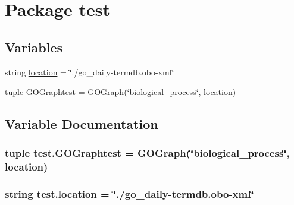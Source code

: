 \hypertarget{namespacetest}{
\section{Package test}
\label{namespacetest}
}
\subsection*{Variables}
\begin{DoxyCompactItemize}
\item 
string \hyperlink{namespacetest_a0bae5ddd9b608f2179d9b18864638081}{location} = \char`\"{}./go\_\-daily-\/termdb.obo-\/xml\char`\"{}
\item 
tuple \hyperlink{namespacetest_a49256f3800de70e9aabf11ea0c3bb8e1}{GOGraphtest} = \hyperlink{class_g_o_graph_1_1_g_o_graph}{GOGraph}(\char`\"{}biological\_\-process\char`\"{}, location)
\end{DoxyCompactItemize}


\subsection{Variable Documentation}
\hypertarget{namespacetest_a49256f3800de70e9aabf11ea0c3bb8e1}{
\subsubsection[{GOGraphtest}]{\setlength{\rightskip}{0pt plus 5cm}tuple {\bf test.GOGraphtest} = {\bf GOGraph}(\char`\"{}biological\_\-process\char`\"{}, location)}}
\label{namespacetest_a49256f3800de70e9aabf11ea0c3bb8e1}
\hypertarget{namespacetest_a0bae5ddd9b608f2179d9b18864638081}{
\subsubsection[{location}]{\setlength{\rightskip}{0pt plus 5cm}string {\bf test.location} = \char`\"{}./go\_\-daily-\/termdb.obo-\/xml\char`\"{}}}
\label{namespacetest_a0bae5ddd9b608f2179d9b18864638081}

